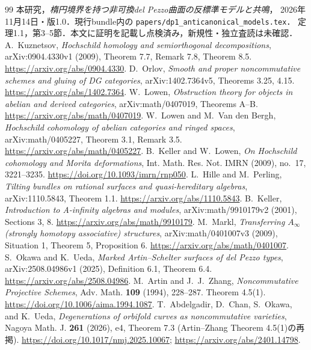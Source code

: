 \documentclass[11pt,a4paper]{ltjsarticle}
\theoremstyle{definition}
\begin{document}
\begingroup
\small
\begin{thebibliography}{99}
本研究，\emph{楕円境界を持つ非可換del Pezzo曲面の反標準モデルと共鳴}，
2026年11月14日・版1.0．現行bundle内の
\nolinkurl{papers/dp1_anticanonical_models.tex}．
定理1.1，第3--5節．本文に証明を記載し点検済み，新規性・独立査読は未確認．
A.~Kuznetsov,
\emph{Hochschild homology and semiorthogonal decompositions},
arXiv:0904.4330v1 (2009), Theorem 7.7, Remark 7.8, Theorem 8.5.
\url{https://arxiv.org/abs/0904.4330}.
D.~Orlov,
\emph{Smooth and proper noncommutative schemes and gluing of DG categories},
arXiv:1402.7364v5, Theorems 3.25, 4.15.
\url{https://arxiv.org/abs/1402.7364}.
W.~Lowen,
\emph{Obstruction theory for objects in abelian and derived categories},
arXiv:math/0407019, Theorems A--B.
\url{https://arxiv.org/abs/math/0407019}.
W.~Lowen and M.~Van den Bergh,
\emph{Hochschild cohomology of abelian categories and ringed spaces},
arXiv:math/0405227, Theorem 3.1, Remark 3.5.
\url{https://arxiv.org/abs/math/0405227}.
B.~Keller and W.~Lowen,
\emph{On Hochschild cohomology and Morita deformations},
Int. Math. Res. Not. IMRN (2009), no.~17, 3221--3235.
\url{https://doi.org/10.1093/imrn/rnp050}.
L.~Hille and M.~Perling,
\emph{Tilting bundles on rational surfaces and quasi-hereditary algebras},
arXiv:1110.5843, Theorem 1.1.
\url{https://arxiv.org/abs/1110.5843}.
B.~Keller,
\emph{Introduction to A-infinity algebras and modules},
arXiv:math/9910179v2 (2001), Sections 3, 8.
\url{https://arxiv.org/abs/math/9910179}.
M.~Markl,
\emph{Transferring $A_\infty$ (strongly homotopy associative) structures},
arXiv:math/0401007v3 (2009), Situation 1, Theorem 5, Proposition 6.
\url{https://arxiv.org/abs/math/0401007}.
S.~Okawa and K.~Ueda,
\emph{Marked Artin--Schelter surfaces of del Pezzo types},
arXiv:2508.04986v1 (2025), Definition 6.1, Theorem 6.4.
\url{https://arxiv.org/abs/2508.04986}.
M.~Artin and J.~J.~Zhang,
\emph{Noncommutative Projective Schemes},
Adv. Math. \textbf{109} (1994), 228--287.
Theorem 4.5(1).
\url{https://doi.org/10.1006/aima.1994.1087}.
T.~Abdelgadir, D.~Chan, S.~Okawa, and K.~Ueda,
\emph{Degenerations of orbifold curves as noncommutative varieties},
Nagoya Math. J. \textbf{261} (2026), e4, Theorem 7.3
(Artin--Zhang Theorem 4.5(1)の再掲).
\url{https://doi.org/10.1017/nmj.2025.10067};
\url{https://arxiv.org/abs/2401.14798}.

\end{thebibliography}
\end{document}
